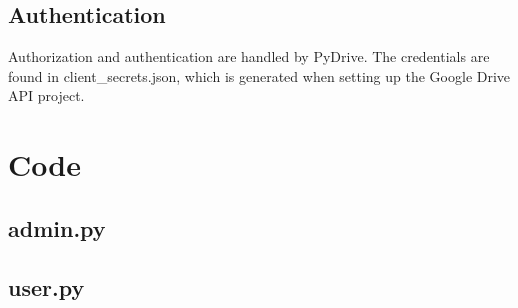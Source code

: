 \documentclass{article}
\begin{document}
	\subsection{Authentication}
		Authorization and authentication are handled by PyDrive. The credentials are found in client\_secrets.json, which is generated when setting up the Google Drive API project.
\section{Code}
	\subsection{admin.py}
	
	\newpage
	\subsection{user.py}
	
\end{document}

